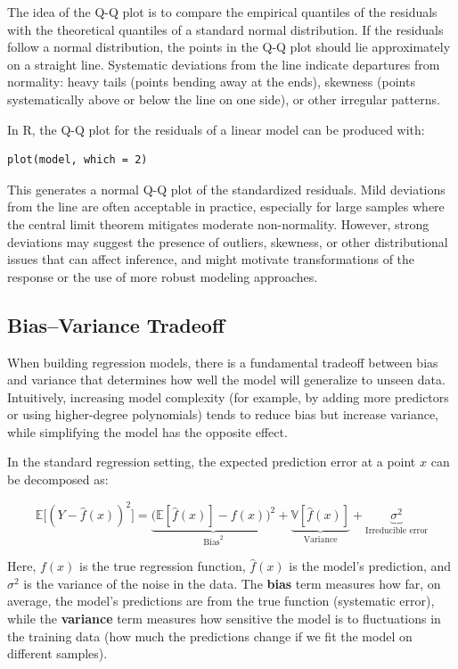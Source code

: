 The idea of the Q-Q plot is to compare the empirical quantiles of the residuals with the theoretical quantiles of a standard normal distribution. If the residuals follow a normal distribution, the points in the Q-Q plot should lie approximately on a straight line. Systematic deviations from the line indicate departures from normality: heavy tails (points bending away at the ends), skewness (points systematically above or below the line on one side), or other irregular patterns.

In R, the Q-Q plot for the residuals of a linear model can be produced with:

\begin{verbatim}
plot(model, which = 2)
\end{verbatim}

This generates a normal Q-Q plot of the standardized residuals. Mild deviations from the line are often acceptable in practice, especially for large samples where the central limit theorem mitigates moderate non-normality. However, strong deviations may suggest the presence of outliers, skewness, or other distributional issues that can affect inference, and might motivate transformations of the response or the use of more robust modeling approaches.



\subsection{Bias–Variance Tradeoff}

When building regression models, there is a fundamental tradeoff between bias and variance that determines how well the model will generalize to unseen data. Intuitively, increasing model complexity (for example, by adding more predictors or using higher-degree polynomials) tends to reduce bias but increase variance, while simplifying the model has the opposite effect.

In the standard regression setting, the expected prediction error at a point $x$ can be decomposed as:

\[
\mathbb{E}\big[(Y - \hat{f}(x))^2\big]
= \underbrace{\big(\mathbb{E}[\hat{f}(x)] - f(x)\big)^2}_{\text{Bias}^2}
+ \underbrace{\mathbb{V}[\hat{f}(x)]}_{\text{Variance}}
+ \underbrace{\sigma^2}_{\text{Irreducible error}}
\]

Here, $f(x)$ is the true regression function, $\hat{f}(x)$ is the model’s prediction, and $\sigma^2$ is the variance of the noise in the data. The \textbf{bias} term measures how far, on average, the model’s predictions are from the true function (systematic error), while the \textbf{variance} term measures how sensitive the model is to fluctuations in the training data (how much the predictions change if we fit the model on different samples).

